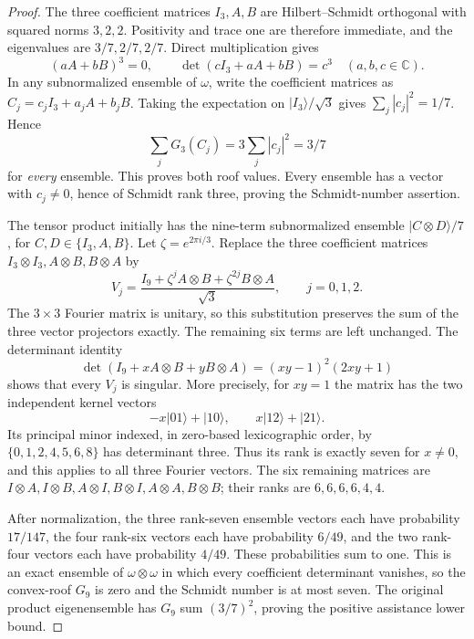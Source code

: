 \begin{proof}
The three coefficient matrices $I_3,A,B$ are Hilbert--Schmidt orthogonal
with squared norms $3,2,2$. Positivity and trace one are therefore
immediate, and the eigenvalues are $3/7,2/7,2/7$.
Direct multiplication gives
\[
        (aA+bB)^3=0,\qquad
        \det(cI_3+aA+bB)=c^3
           \quad(a,b,c\in\mathbb C).
\]
In any subnormalized ensemble of $\omega$, write the coefficient
matrices as $C_j=c_jI_3+a_jA+b_jB$. Taking the expectation on
$|I_3\rangle/\sqrt3$ gives $\sum_j|c_j|^2=1/7$. Hence
\[
         \sum_jG_3(C_j)=3\sum_j|c_j|^2=3/7
\]
for \emph{every} ensemble. This proves both roof values. Every ensemble
has a vector with $c_j\ne0$, hence of Schmidt rank three, proving the
Schmidt-number assertion.

The tensor product initially has the nine-term subnormalized ensemble
$|C\otimes D\rangle/7$, for $C,D\in\{I_3,A,B\}$.
Let $\zeta=e^{2\pi i/3}$. Replace the three coefficient matrices
$I_3\otimes I_3,A\otimes B,B\otimes A$ by
\[
          V_j=\frac{I_9+\zeta^jA\otimes B
                           +\zeta^{2j}B\otimes A}{\sqrt3},
                   \qquad j=0,1,2.
\]
The $3\times3$ Fourier matrix is unitary, so this substitution preserves
the sum of the three vector projectors exactly. The remaining six terms
are left unchanged.
The determinant identity
\[
 \det(I_9+xA\otimes B+yB\otimes A)
                       =(xy-1)^2(2xy+1)
\]
shows that every $V_j$ is singular. More precisely, for $xy=1$ the
matrix has the two independent kernel vectors
\[
    -x|01\rangle+|10\rangle,
                 \qquad x|12\rangle+|21\rangle.
\]
Its principal minor indexed, in zero-based lexicographic order, by
$\{0,1,2,4,5,6,8\}$ has determinant three. Thus its rank is exactly
seven for $x\ne0$, and this applies to all three Fourier vectors.
The six remaining matrices are
$I\otimes A,I\otimes B,A\otimes I,B\otimes I,A\otimes A,B\otimes B$;
their ranks are $6,6,6,6,4,4$.

After normalization, the three rank-seven ensemble vectors each have
probability $17/147$, the four rank-six vectors each have probability
$6/49$, and the two rank-four vectors each have probability $4/49$.
These probabilities sum to one. This is an exact ensemble of
$\omega\otimes\omega$ in which every coefficient determinant vanishes,
so the convex-roof $G_9$ is zero and the Schmidt number is at most seven.
The original product eigenensemble has $G_9$ sum $(3/7)^2$, proving the
positive assistance lower bound.
\end{proof}

